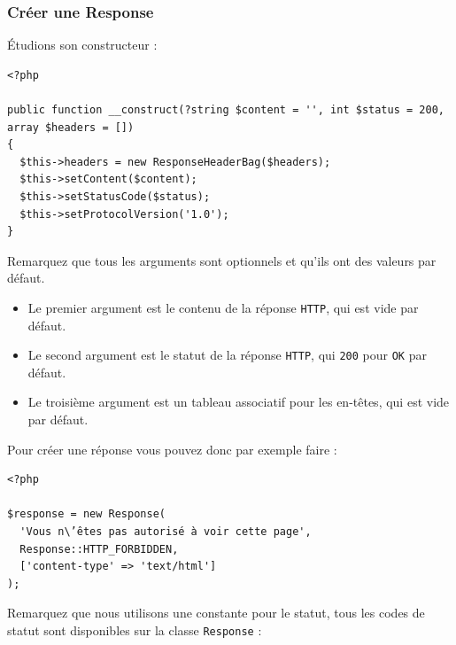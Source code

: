 \documentclass{article}
\begin{document}
\subsubsection{Créer une Response}
Étudions son constructeur :

\begin{verbatim}
<?php

public function __construct(?string $content = '', int $status = 200, array $headers = [])
{
  $this->headers = new ResponseHeaderBag($headers);
  $this->setContent($content);
  $this->setStatusCode($status);
  $this->setProtocolVersion('1.0');
}
\end{verbatim}
Remarquez que tous les arguments sont optionnels et qu'ils ont des valeurs par défaut.
\begin{itemize}
\item Le premier argument est le contenu de la réponse {\tt HTTP}, qui est vide par défaut.
\item Le second argument est le statut de la réponse {\tt HTTP}, qui {\tt 200} pour {\tt OK} par défaut.
\item Le troisième argument est un tableau associatif pour les en-têtes, qui est vide par défaut.

\end{itemize}

Pour créer une réponse vous pouvez donc par exemple faire :

\begin{verbatim}
<?php

$response = new Response(
  'Vous n\’êtes pas autorisé à voir cette page',
  Response::HTTP_FORBIDDEN,
  ['content-type' => 'text/html']
);
\end{verbatim}

Remarquez que nous utilisons une constante pour le statut, tous les codes de statut sont disponibles sur la classe {\tt Response} :
\end{document}
